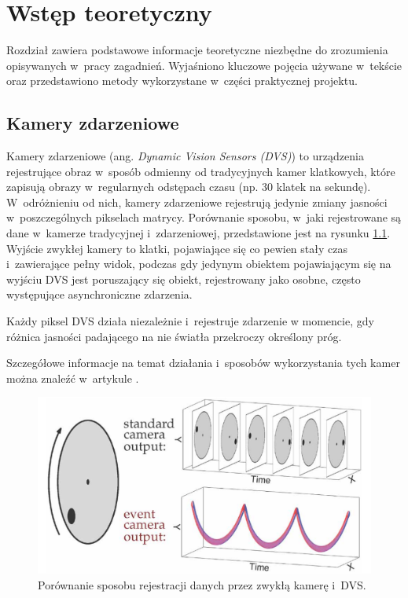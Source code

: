 \chapter{Wstęp teoretyczny}
\label{cha:wstep}


Rozdział zawiera podstawowe informacje teoretyczne niezbędne do zrozumienia opisywanych w~pracy zagadnień. Wyjaśniono kluczowe pojęcia używane w~tekście oraz przedstawiono metody wykorzystane w~części praktycznej projektu. 


\section{Kamery zdarzeniowe}
\label{sec:kamery_zdarzeniowe}

Kamery zdarzeniowe (ang. \textit{Dynamic Vision Sensors (DVS)}) to urządzenia rejestrujące obraz w~sposób odmienny od tradycyjnych kamer klatkowych, które zapisują obrazy w~regularnych odstępach czasu (np. 30 klatek na sekundę). W~odróżnieniu od nich, kamery zdarzeniowe rejestrują jedynie zmiany jasności w~poszczególnych pikselach matrycy. Porównanie sposobu, w~jaki rejestrowane są dane w~kamerze tradycyjnej i~zdarzeniowej, przedstawione jest na rysunku \ref{fig:dvs_vs_camera}. Wyjście zwykłej kamery to klatki, pojawiające się co pewien stały czas i~zawierające pełny widok, podczas gdy jedynym obiektem pojawiającym się na wyjściu DVS jest poruszający się obiekt, rejestrowany jako osobne, często występujące asynchroniczne zdarzenia.

Każdy piksel DVS działa niezależnie i~rejestruje zdarzenie w momencie, gdy różnica jasności padającego na nie światła przekroczy określony próg. 

Szczegółowe informacje na temat działania i~sposobów wykorzystania tych kamer można znaleźć w~artykule \cite{dvs_survey}.

\begin{figure}
    \centering
    \includegraphics[width=0.7\linewidth]{images/events_dynamic_obstacle.png}
    \caption{Porównanie sposobu rejestracji danych przez zwykłą kamerę i~DVS.}
    \label{fig:dvs_vs_camera}
\end{figure}

